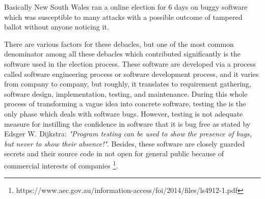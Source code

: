   \noindent
  Basically New South Wales ran a online election for 6 days on 
  buggy software which was susceptible to many attacks with a possible 
  outcome of tampered ballot without anyone noticing it. 
%  
%   
   
   There are various factors for these debacles, but one of the most 
   common denominator among all these debacles
   which contributed significantly  is the software used in the election process. 
   These software are developed via a process called software engineering process 
   or software development process, and it varies from company to company, 
   but  roughly, it translates to  requirement 
   gathering, software design, implementation, testing, and maintenance. 
   During this whole process of transforming a vague idea into 
   concrete software, testing the is the only phase which deals 
   with software bugs. However, testing is not adequate measure
   for instilling the confidence in software that it is bug free 
   as stated by Edsger W. Dijkstra:
   \textit{ "Program testing can be used to show the presence of bugs, 
    but never to show their absence!"}. Besides, these software 
    are closely guarded secrets and their source 
   code in not open for general public because of commercial 
   interests of companies 
   \footnote{https://www.aec.gov.au/information-access/foi/2014/files/ls4912-1.pdf}.
   
